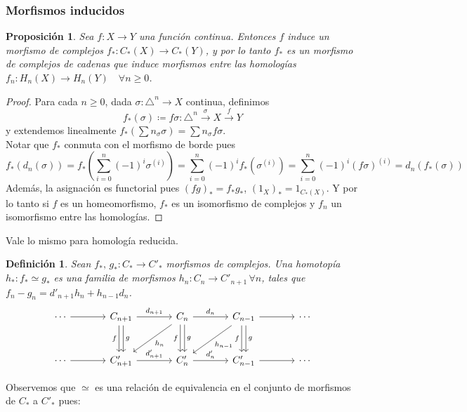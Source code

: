 \documentclass[12pt,a4paper]{article}
\newtheorem{proposition}[theorem]{Proposición}
\newtheorem{definition}[theorem]{Definición}
\begin{document}
\subsubsection{Morfismos inducidos}
\begin{proposition}
Sea $f: X \rightarrow Y$ una función continua. Entonces $f$ induce un morfismo de complejos $f_*: C_*(X) \rightarrow C_*(Y)$, y por lo tanto $f_*$ es un morfismo de complejos de cadenas que induce morfismos entre las homologías $f_n: H_n(X) \rightarrow H_n(Y) \quad \forall n \geq 0$.
\end{proposition}
\begin{proof}
Para cada $n \geq 0$, dada $\sigma : \triangle^n \rightarrow X$ continua, definimos 
\[
f_*(\sigma) \coloneqq f\sigma : \triangle^n \xrightarrow{\sigma} X \xrightarrow{f} Y
\]
y extendemos linealmente $f_*(\sum n_\sigma \sigma) = \sum n_\sigma f \sigma$.
\\
Notar que $f_*$ conmuta con el morfismo de borde pues
\[
f_*(d_n(\sigma)) = f_*(\sum_{i=0}^n(-1)^i \sigma^{(i)}) = \sum_{i=0}^n(-1)^i f_*(\sigma^{(i)}) = \sum_{i=0}^n(-1)^i (f\sigma)^{(i)} = d_n(f_*(\sigma))
\]
Además, la asignación es functorial pues $(fg)_* = f_*g_*$, $(1_X)_* = 1_{C_*(X)}$. Y por lo tanto si $f$ es un homeomorfismo, $f_*$ es un isomorfismo de complejos y $f_n$ un isomorfismo entre las homologías.
\end{proof}
Vale lo mismo para homología reducida.
\begin{definition}
Sean $f_*, \, g_* : C_* \rightarrow C'_*$ morfismos de complejos. Una \textit{homotopía} $h_*: f_* \simeq g_*$ es una familia de morfismos $h_n: C_n \rightarrow C'_{n+1} \, \forall n$, tales que $f_n - g_n = d'_{n+1}h_n + h_{n-1}d_n$.
\[
\begin{tikzcd}[column sep=large, row sep=large]
\cdots \arrow[r] 
  & C_{n+1} 
    \arrow[r, "d_{n+1}"] 
    \arrow[d, shift right=0.5ex, "f"'] 
    \arrow[d, shift left=0.5ex, "g"] 
  & C_n 
    \arrow[r, "d_n"] 
    \arrow[d, shift right=0.5ex, "f"'] 
    \arrow[d, shift left=0.5ex, "g"] 
    \arrow[dl, "h_n"] 
  & C_{n-1} 
    \arrow[r] 
    \arrow[d, shift right=0.5ex, "f"'] 
    \arrow[d, shift left=0.5ex, "g"] 
    \arrow[dl, "h_{n-1}"] 
  & \cdots \\
\cdots \arrow[r] 
  & C'_{n+1} \arrow[r, "d'_{n+1}"] 
  & C'_n \arrow[r, "d'_n"] 
  & C'_{n-1} \arrow[r] 
  & \cdots
\end{tikzcd}
\]
\end{definition}
Observemos que $\simeq$ es una relación de equivalencia en el conjunto de morfismos de $C_*$ a $C'_*$ pues:
\end{document}
